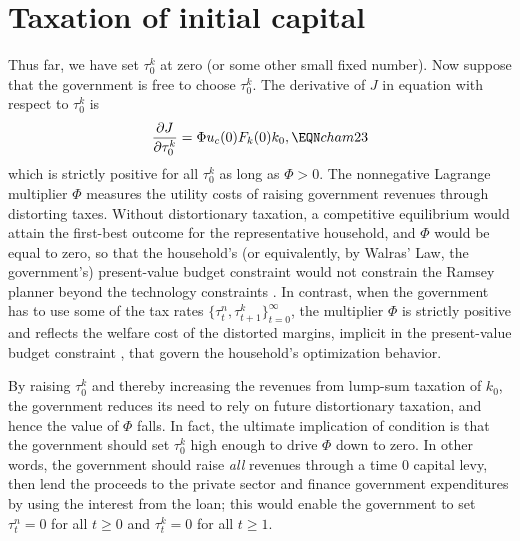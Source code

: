 \section{Taxation of initial capital}
 Thus far, we have set $\tau^k_0$ at zero (or some other small
fixed number).  Now suppose that the government is free to choose
$\tau^k_0$.  The derivative of $J$ in equation  with respect
to $\tau^k_0$ is
$$ {\partial J \over \partial \tau^k_0}
   =   \Phi u_c(0) F_k(0) k_0,  \EQN cham23 $$
which is strictly positive for all $\tau^k_0$ as long as $\Phi>0$.
The nonnegative Lagrange multiplier $\Phi$
measures the utility costs of raising government revenues
through distorting taxes.  Without distortionary taxation, a
competitive equilibrium would attain the first-best outcome
for the representative household, and $\Phi$ would be equal to
zero, so that  the household's (or equivalently, by Walras' Law,
 the government's) present-value budget constraint would not  constrain
 the Ramsey planner
beyond  the  technology constraints .
In contrast, when the government has to use some of the tax rates
$\{\tau^n_t, \tau^k_{t+1}\}_{t=0}^\infty$, the multiplier $\Phi$ is
strictly positive and reflects the welfare cost of
the distorted margins, implicit in the present-value budget constraint
, that govern the household's optimization behavior.

By raising $\tau^k_0$ and thereby increasing the revenues from
lump-sum taxation of $k_0$, the government reduces its need to
rely on future distortionary taxation, and hence the value of $\Phi$ falls.
In fact, the ultimate implication of condition  is that
the government should set $\tau^k_0$ high enough to drive $\Phi$
down to zero. In other words, the government should raise {\it all\/}
revenues through a time $0$ capital levy, then lend the proceeds
to the private sector and finance government expenditures
by using the interest from the loan; this would enable
the government to set $\tau^n_t = 0$ for all $t\geq0 $ and
$ \tau^k_t = 0 $ for all $t \geq 1$.



